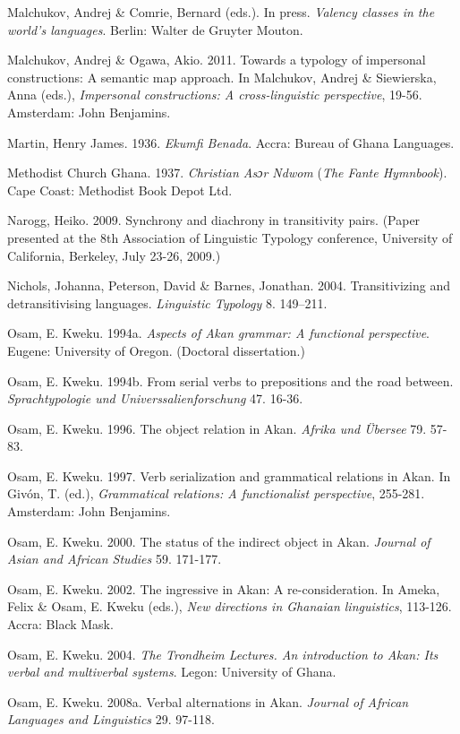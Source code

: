 \documentclass[output=paper]{langsci/langscibook}
\begin{document}
Malchukov, Andrej \& Comrie, Bernard (eds.). In press. \textit{Valency classes in the world’s languages}. Berlin: Walter de Gruyter Mouton.

Malchukov, Andrej \& Ogawa, Akio. 2011. Towards a typology of impersonal constructions: A semantic map approach. In Malchukov, Andrej \& Siewierska, Anna (eds.), \textit{Impersonal constructions: A cross-linguistic perspective}, 19-56. Amsterdam: John Benjamins.

Martin, Henry James. 1936. \emph{Ekumfi Benada}. Accra: Bureau of Ghana Languages.

Methodist Church Ghana. 1937. \textit{Christian Asɔr Ndwom }(\textit{The Fante Hymnbook}). Cape Coast: Methodist Book Depot Ltd.

Narogg, Heiko. 2009. Synchrony and diachrony in transitivity pairs. (Paper presented at the 8th Association of Linguistic Typology conference, University of California, Berkeley, July 23-26, 2009.)

Nichols, Johanna, Peterson, David \& Barnes, Jonathan. 2004. Transitivizing and detransitivising languages. \textit{Linguistic Typology} 8. 149–211.

Osam, E. Kweku. 1994a. \textit{Aspects of Akan grammar: A functional perspective}. Eugene: University of Oregon. (Doctoral dissertation.)

Osam, E. Kweku. 1994b. From serial verbs to prepositions and the road between. \textit{Sprachtypologie und Universsalienforschung} 47. 16-36.

Osam, E. Kweku. 1996. The object relation in Akan. \textit{Afrika und Übersee} 79. 57-83.

Osam, E. Kweku. 1997. Verb serialization and grammatical relations in Akan. In Giv\'{o}n, T. (ed.), \textit{Grammatical relations: A functionalist perspective}, 255-281. Amsterdam: John Benjamins.

Osam, E. Kweku. 2000. The status of the indirect object in Akan. \textit{Journal of Asian and African Studies }59. 171-177.

Osam, E. Kweku. 2002. The ingressive in Akan: A re-consideration. In Ameka, Felix \& Osam, E. Kweku (eds.), \textit{New directions in Ghanaian linguistics}, 113-126. Accra: Black Mask.

Osam, E. Kweku. 2004. \textit{The Trondheim Lectures. An introduction to Akan: Its verbal and multiverbal systems}. Legon: University of Ghana.

Osam, E. Kweku. 2008a. Verbal alternations in Akan. \textit{Journal of African Languages and Linguistics} 29. 97-118.
\end{document}
